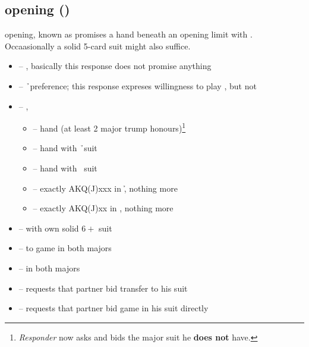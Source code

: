 \subsection{\ctr{2\protect\d} opening ()}
\label{subsec:2d-op}

\ctr{2\d} opening, known as  promises a hand beneath an opening limit with .
Occaasionally a solid 5-card suit might also suffice. \vspace{1em}

\begin{itemize}
  \item \ctr{2\h} -- \neg, basically this response does not promise anything
  \item \ctr{2\s} -- \h\ preference; this response expreses willingness to play \ctr{3\h}, but not \ctr{3\s}
  \item \ctr{2\nt} -- \gf, 
  \begin{itemize}
    \item \ctr{3\c} -- \pos\/ hand (at least 2 major trump honours)\footnote{
      \emph{Responder} now asks \ctr{3\d} and \opn\/ bids the major suit he \textbf{does not} have.
    }
    \item \ctr{3\d} -- \neg\/ hand with \h\ suit
    \item \ctr{3\h} -- \neg\/ hand with \s\ suit
    \item \ctr{3\s} -- exactly AKQ(J)xxx in \h, nothing more
    \item \ctr{3\nt} -- exactly AKQ(J)xx in \s, nothing more
  \end{itemize}
  \item \ctr{3\c} -- \gf\/ with own solid $6+$ suit
  \item \ctr{3\d} -- \inv\/ to game \ws{} in both majors
  \item \ctr{3\h} -- \preempt\/ \ws{} in both majors
  \item \ctr{4\c} -- requests that partner bid transfer to his suit
  \item \ctr{4\d} -- requests that partner bid game in his suit directly
\end{itemize}
